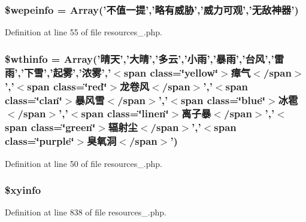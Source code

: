 \hypertarget{cache_2resources__1_8php_a24d2c967a140f9ff99ba082c9353f696}{
\subsubsection[{\$wepeinfo}]{\setlength{\rightskip}{0pt plus 5cm}\$wepeinfo = Array('不值一提','略有威胁','威力可观','无敌神器')}}\label{cache_2resources__1_8php_a24d2c967a140f9ff99ba082c9353f696}


Definition at line 55 of file resources\+\_.\+php.

\hypertarget{cache_2resources__1_8php_a42c20343a70aaec3fcdbace0179e4eb2}{
\subsubsection[{\$wthinfo}]{\setlength{\rightskip}{0pt plus 5cm}\$wthinfo = Array('晴天','大晴','多云','小雨','暴雨','台风','雷雨','下雪','起雾','浓雾','$<$span class=\char`\"{}yellow\char`\"{}$>$瘴气$<$/span$>$','$<$span class=\char`\"{}red\char`\"{}$>$龙卷风$<$/span$>$','$<$span class=\char`\"{}clan\char`\"{}$>$暴风雪$<$/span$>$','$<$span class=\char`\"{}blue\char`\"{}$>$冰雹$<$/span$>$','$<$span class=\char`\"{}linen\char`\"{}$>$离子暴$<$/span$>$','$<$span class=\char`\"{}green\char`\"{}$>$辐射尘$<$/span$>$','$<$span class=\char`\"{}purple\char`\"{}$>$臭氧洞$<$/span$>$')}}\label{cache_2resources__1_8php_a42c20343a70aaec3fcdbace0179e4eb2}


Definition at line 50 of file resources\+\_.\+php.

\hypertarget{cache_2resources__1_8php_aabc8b00fb3b56eab2f2d6ff8e1f0839c}{
\subsubsection[{\$xyinfo}]{\setlength{\rightskip}{0pt plus 5cm}\$xyinfo}}\label{cache_2resources__1_8php_aabc8b00fb3b56eab2f2d6ff8e1f0839c}


Definition at line 838 of file resources\+\_.\+php.


